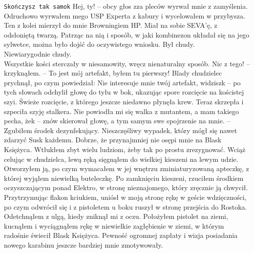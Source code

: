 \documentclass[../MAIN.tex]{subfiles}
\begin{document}
\swk[12em]\texttt{Skończysz tak samo\3k}\qwk
\sx Hej, ty! -- obcy głos zza pleców wyrwał mnie z zamyślenia.
\qd
Odruchowo wyrwałem mego USP Experta z kabury i wycelowałem w przybysza. Ten z kolei mierzył do mnie Browningiem HP. Miał na sobie SEVA’ę, z odsłoniętą twarzą. Patrząc na nią i sposób, w jaki kombinezon układał się na jego sylwetce, można było dojść do oczywistego wniosku. Był chudy.\\
Niewiarygodnie chudy.\\
Wszystkie kości sterczały w niesamowity, wręcz nienaturalny sposób.
\sx Nic z tego! -- krzyknąłem. -- To jest mój artefakt, byłem tu pierwszy!
\qd
Blady chudzielec prychnął, po czym powiedział:
\sx Nie interesuje mnie twój artefakt, widzisz\3k -- po tych słowach odchylił głowę do tyłu w bok, ukazując spore rozcięcie na kościstej szyi.
\qd
Świeże rozcięcie, z którego jeszcze niedawno płynęła krew. Teraz skrzepła i szpeciła szyję stalkera. 
\sx Nie powiodła mi się walka z mutantem, a mam takiego pecha, że\3k -- znów skierował głowę, a tym samym swe spojrzenie na mnie. -- Zgubiłem środek dezynfekujący. Nieszczęśliwy wypadek, który mógł się nawet zdarzyć Sus\3k każdemu.
\qd
Dobrze, że przynajmniej nie osępi mnie na Blask Księżyca. Wtłukłem zbyt wielu ludziom, żeby tak po prostu zrezygnować. Wciąż celując w chudzielca, lewą ręką sięgnąłem do wielkiej kieszeni na lewym udzie. Otworzyłem ją, po czym wymacałem w jej wnętrzu zminiaturyzowaną apteczkę, z której wyjąłem niewielką buteleczkę. Po zamknięciu kieszeni, rzuciłem środkiem oczyszczającym ponad Elektro, w stronę nieznajomego, który zręcznie ją chwycił.\\
Przytrzymując flakon kciukiem, uniósł w moją stronę rękę w geście wdzięczności, po czym odwrócił się i z pistoletem u boku ruszył w stronę przejścia do Rostoka. Odetchnąłem z ulgą, kiedy zniknął mi z oczu. Położyłem pistolet na ziemi, kucnąłem i wyciągnąłem rękę w niewielkie zagłębienie w ziemi, w którym radośnie świecił Blask Księżyca. Pewność ogromnej zapłaty i wizja posiadania nowego karabinu jeszcze bardziej mnie zmotywowały.
\end{document}

